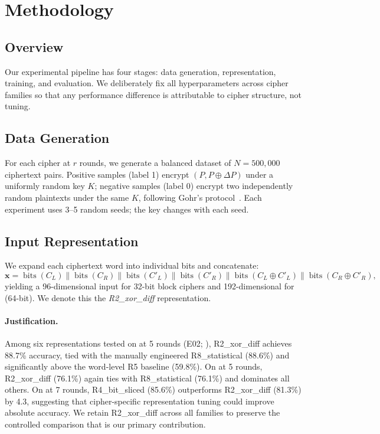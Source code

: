 \section{Methodology}
\label{sec:method}

\subsection{Overview}

Our experimental pipeline has four stages: data generation, representation, training, and evaluation.
We deliberately fix all hyperparameters across cipher families so that any performance difference is attributable to cipher structure, not tuning.

\subsection{Data Generation}

For each cipher at $r$ rounds, we generate a balanced dataset of $N = 500{,}000$ ciphertext pairs.
Positive samples (label 1) encrypt $(P, P \oplus \Delta P)$ under a uniformly random key $K$; negative samples (label 0) encrypt two independently random plaintexts under the same $K$, following Gohr's protocol~\citep{gohr2019}.
Each experiment uses 3--5 random seeds; the key changes with each seed.

\subsection{Input Representation}
\label{sec:representation}

We expand each ciphertext word into individual bits and concatenate:
\begin{equation}
  \mathbf{x} = \operatorname{bits}(C_L) \| \operatorname{bits}(C_R) \| \operatorname{bits}(C'_L) \| \operatorname{bits}(C'_R) \| \operatorname{bits}(C_L \oplus C'_L) \| \operatorname{bits}(C_R \oplus C'_R),
\end{equation}
yielding a 96-dimensional input for 32-bit block ciphers and 192-dimensional for \present (64-bit).
We denote this the \emph{R2\_xor\_diff} representation.

\paragraph{Justification.}
Among six representations tested on \speck at 5 rounds (E02; ), R2\_xor\_diff achieves 88.7\% accuracy, tied with the manually engineered R8\_statistical (88.6\%) and significantly above the word-level R5 baseline (59.8\%).
On \present at 5 rounds, R2\_xor\_diff (76.1\%) again ties with R8\_statistical (76.1\%) and dominates all others.
On \simon at 7 rounds, R4\_bit\_sliced (85.6\%) outperforms R2\_xor\_diff (81.3\%) by 4.3\pp, suggesting that cipher-specific representation tuning could improve absolute accuracy.
We retain R2\_xor\_diff across all families to preserve the controlled comparison that is our primary contribution.

